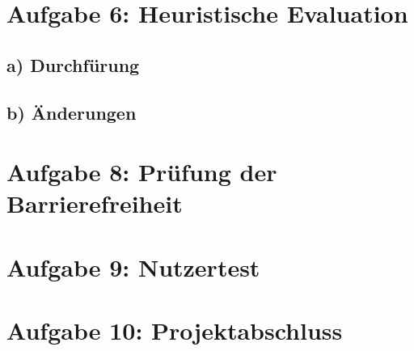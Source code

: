 \documentclass[parskip,10pt,abstracton]{scrartcl}
\begin{document}
\section*{Aufgabe 6: Heuristische Evaluation}

\subsection*{a) Durchfürung}
\subsection*{b) Änderungen}



\section*{Aufgabe 8: Prüfung der Barrierefreiheit}


\section*{Aufgabe 9: Nutzertest}

\section*{Aufgabe 10: Projektabschluss}
\end{document}
